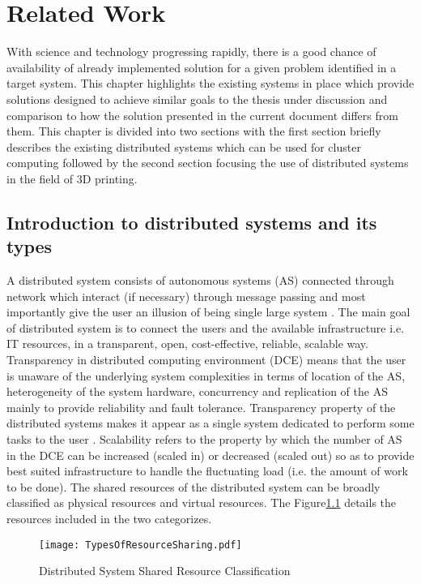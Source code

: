\chapter{Related Work} \label{RelW}

With science and technology progressing rapidly, there is a good chance of availability of already implemented solution for a given problem identified in a target system. This chapter highlights the existing systems in place which provide solutions designed to achieve similar goals to the thesis under discussion and comparison to how the solution presented in the current document differs from them. This chapter is divided into two sections with the first section briefly describes the existing distributed systems which can be used for cluster computing followed by the second section focusing the use of distributed systems in the field of 3D printing.

\section{Introduction to distributed systems and its types}
A distributed system consists of autonomous systems (AS) connected through network which interact (if necessary) through message passing and most importantly give the user an illusion of being single large system \cite{DCE}. The main goal of distributed system is to connect the users and the available infrastructure i.e. IT resources, in a transparent, open, cost-effective, reliable, scalable way. Transparency in distributed computing environment (DCE) means that the user is unaware of the underlying system complexities in terms of location of the AS, heterogeneity of the system hardware, concurrency and replication of the AS mainly to provide reliability and fault tolerance. Transparency property of the distributed systems makes it appear as a single system dedicated to perform some tasks to the user \cite{DSBook}. Scalability refers to the property by which the number of AS in the DCE can be increased (scaled in) or decreased (scaled out) so as to provide best suited infrastructure to handle the fluctuating load (i.e. the amount of work to be done). The shared resources of the distributed system can be broadly classified as physical resources and virtual resources. The Figure\ref{fig:TORS} details the resources included in the two categorizes. 

\begin{figure}[ht!]
\centering
\texttt{[image: TypesOfResourceSharing.pdf]}
\caption{Distributed System Shared Resource Classification}
\label{fig:TORS}
\end{figure}
  
